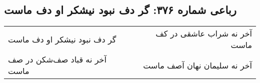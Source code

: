 \begin{center}
\section*{رباعی شماره ۳۷۶: گر دف نبود نیشکر او دف ماست}
\label{sec:0376}
\begin{longtable}{l p{0.5cm} r}
گر دف نبود نیشکر او دف ماست
&&
آخر نه شراب عاشقی در کف ماست
\\
آخر نه قباد صف‌شکن در صف ماست
&&
آخر نه سلیمان نهان آصف ماست
\\
\end{longtable}
\end{center}
